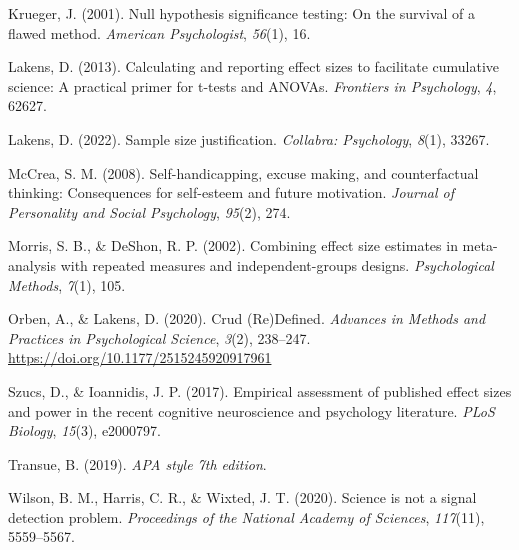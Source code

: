 \documentclass[
  man]{apa7}
\newlength{\cslhangindent}
\newenvironment{CSLReferences}[2] %
 {\begin{list}{}{%
  \setlength{\itemindent}{0pt}
  \setlength{\leftmargin}{0pt}
  \setlength{\parsep}{0pt}
  \ifodd #1
   \setlength{\leftmargin}{\cslhangindent}
   \setlength{\itemindent}{-1\cslhangindent}
  \fi
  \setlength{\itemsep}{#2\baselineskip}}}
 {\end{list}}
\begin{document}
\begin{CSLReferences}{1}{0}
Krueger, J. (2001). Null hypothesis significance testing: On the survival of a flawed method. \emph{American Psychologist}, \emph{56}(1), 16.

Lakens, D. (2013). Calculating and reporting effect sizes to facilitate cumulative science: A practical primer for t-tests and ANOVAs. \emph{Frontiers in Psychology}, \emph{4}, 62627.

Lakens, D. (2022). Sample size justification. \emph{Collabra: Psychology}, \emph{8}(1), 33267.

McCrea, S. M. (2008). Self-handicapping, excuse making, and counterfactual thinking: Consequences for self-esteem and future motivation. \emph{Journal of Personality and Social Psychology}, \emph{95}(2), 274.

Morris, S. B., \& DeShon, R. P. (2002). Combining effect size estimates in meta-analysis with repeated measures and independent-groups designs. \emph{Psychological Methods}, \emph{7}(1), 105.

Orben, A., \& Lakens, D. (2020). Crud ({Re}){Defined}. \emph{Advances in Methods and Practices in Psychological Science}, \emph{3}(2), 238--247. \url{https://doi.org/10.1177/2515245920917961}

Szucs, D., \& Ioannidis, J. P. (2017). Empirical assessment of published effect sizes and power in the recent cognitive neuroscience and psychology literature. \emph{PLoS Biology}, \emph{15}(3), e2000797.

Transue, B. (2019). \emph{APA style 7th edition}.

Wilson, B. M., Harris, C. R., \& Wixted, J. T. (2020). Science is not a signal detection problem. \emph{Proceedings of the National Academy of Sciences}, \emph{117}(11), 5559--5567.

\end{CSLReferences}
\end{document}
